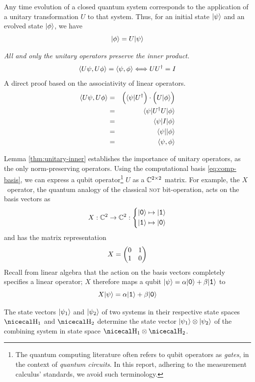 \documentclass[a4paper,11pt, oneside]{report}
\newcommand{\concept}[1]{\emph{#1}}
\newcommand{\acro}[1]{\textsc{#1}}
\newcommand{\strongpar}{\medskip\par}
\begin{document}
\label{thm:post-time} Any time evolution of a closed quantum system corresponds to the application of a unitary transformation $U$ to that system. Thus, for an initial state $\lvert\psi\rangle$ and an evolved state $\lvert\phi\rangle$, we have
$$\lvert\phi\rangle = U\lvert\psi\rangle$$

\lemma \label{thm:unitary-inner} {\it All and only the unitary operators preserve the inner product.}
$$\langle U\psi , U\phi\rangle = \langle\psi , \phi\rangle \Longleftrightarrow UU^\dagger = I $$
\proof A direct proof based on the associativity of linear operators.
\begin{eqnarray*}
	\langle U\psi , U\phi\rangle &=& \Big(\langle\psi\rvert U^\dagger\Big) \cdot \Big(U \lvert\phi\rangle\Big) \\
	     &=& \langle\psi\rvert U^\dagger U \lvert\phi\rangle \\
	     &=& \langle\psi\rvert I \lvert\phi\rangle \\
	     &=& \langle\psi\rvert\lvert\phi\rangle \\
	     &=& \langle\psi, \phi\rangle
\end{eqnarray*}

\strongpar
Lemma \ref{thm:unitary-inner} establishes the importance of unitary operators, as the only norm-preserving operators. Using the computational basis \eqref{eq:comp-basis}, we can express a qubit operator\footnote{The quantum computing literature often refers to qubit operators as \concept{gates}, in the context of \concept{quantum circuits}. In this report, adhering to the measurement calculus' standards, we avoid such terminology.} $U$ as a $\mathbb{C}^{2 \times 2}$ matrix. For example, the $X$~operator, the quantum analogy of the classical \acro{not} bit-operation, acts on the basis vectors as
$$X: \complex^2 \to \complex^2 :
\left\{\begin{alignedat}{2}
     	      \ketb 0 & \mapsto \ketb 1\\
	      \ketb 1 & \mapsto \ketb 0
\end{alignedat} \right.$$
and has the matrix representation
$$X = \begin{pmatrix}0 & 1 \\ 1 & 0\end{pmatrix}$$
Recall from linear algebra that the action on the basis vectors completely specifies a linear operator; $X$ therefore maps a qubit $\ket \psi = \alpha\ketb 0 + \beta\ketb 1$ to
$$X\ket \psi = \alpha \ketb 1 + \beta \ketb 0$$


\label{thm:post-compose} The state vectors $\lvert\psi_1\rangle$ and $\lvert\psi_2\rangle$ of two systems in their respective state spaces $\hilbert_1$ and $\hilbert_2$ determine the state vector $\lvert\psi_1\rangle \otimes \lvert\psi_2\rangle$ of the combining system in state space $\hilbert_1 \otimes \hilbert_2$.
\end{document}
